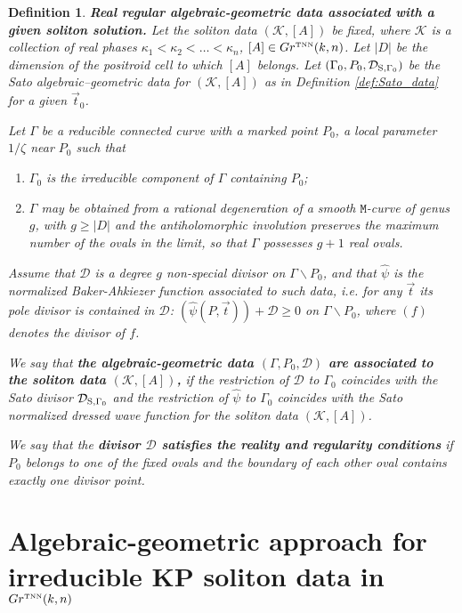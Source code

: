 \documentclass[11pt]{amsart}
\theoremstyle{plain}
\numberwithin{equation}{section}
\newtheorem{definition}{Definition}[subsection]
\def \GTNN {{Gr^{\mbox{\tiny TNN}} (k,n)}}
\def \DS {{\mathcal D}_{\textup{\scriptsize S},\Gamma_0}}
\begin{document}
\begin{definition}
\label{def:rrss}
\textbf{Real regular algebraic-geometric data associated with a given soliton solution.}
Let the soliton data $({\mathcal K},[A])$ be fixed, where ${\mathcal K}$ is a 
collection of real phases $\kappa_1<\kappa_2<\ldots <\kappa_n$, $[A]\in \GTNN$. Let $|D|$ be the dimension of the positroid cell to which $[A]$ belongs. Let $(\Gamma_0, P_0, \DS)$ be the Sato algebraic--geometric data for $({\mathcal K},[A])$ as in Definition \ref{def:Sato_data} for a given $\vec t_0$.

Let $\Gamma$ be a reducible connected curve with a marked point $P_0$, a local parameter $1/\zeta$ near $P_0$ such that 
\begin{enumerate}
\item $\Gamma_0$ is the irreducible component of $\Gamma$ containing $P_0$;
\item $\Gamma$  may be obtained from a rational degeneration of a smooth ${\mathtt M}$-curve of genus $g$, with $g\ge |D|$ and the antiholomorphic involution preserves the maximum number of the ovals in the limit, so that $\Gamma$ possesses $g+1$ real ovals. 
\end{enumerate}

Assume that ${\mathcal D}$ is a degree $g$ non-special divisor on $\Gamma\backslash P_0$, and that $\hat\psi$ is the normalized Baker-Ahkiezer function associated to such data, i.e. for any $\vec t$ its pole divisor is contained in ${\mathcal D}$: $({\hat \psi} (P , \vec t))+{\mathcal D} \ge 0$ on $\Gamma\backslash P_0$, where $(f)$ denotes the divisor of $f$.

We say that  \textbf{the algebraic-geometric data $(\Gamma, P_0,{\mathcal D})$ are associated to the soliton data $({\mathcal K},[A])$,} if the restriction of ${\mathcal D}$ to $\Gamma_0$ coincides with the Sato divisor $\DS$ and
the restriction of $\hat\psi$ to $\Gamma_0$ coincides with the Sato normalized dressed wave function for the soliton data $({\mathcal K},[A])$. 
 
We say that the \textbf{divisor 
${\mathcal D}$ satisfies the reality and regularity conditions} if $P_0$ belongs to one of the fixed ovals and the boundary of each other oval contains exactly one divisor point. 
\end{definition}


\section{Algebraic-geometric approach for irreducible KP soliton data in $\GTNN$}\label{sec:3}
\end{document}

